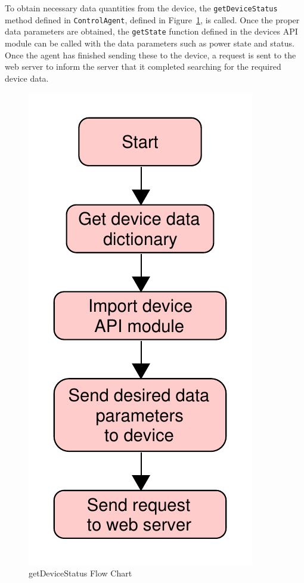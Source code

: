 \documentclass[conference]{IEEEtran}
\begin{document}
To obtain necessary data quantities from the device, the
\texttt{getDeviceStatus} method defined in \texttt{ControlAgent}, defined in Figure~\ref{fig:getDeviceStatus}, is called. Once the proper data parameters are
obtained, the \texttt{getState} function defined in the devices API module can
be called with the data parameters such as power state and
status. Once the agent has finished sending these to the device, a request is
sent to the web server to inform the server that it completed searching for the
required device data. %
%
\begin{figure}[htbp]
    \centering
    \includegraphics[scale=0.3]{figs/agents/getDeviceStatus.pdf}
    \caption{getDeviceStatus Flow Chart}
    \label{fig:getDeviceStatus}
\end{figure}
\end{document}
